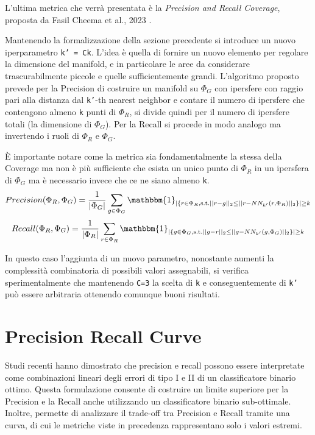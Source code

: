 L'ultima metrica che verrà presentata è la \textit{Precision and Recall Coverage}, proposta da Fasil Cheema et al., 2023 \cite{1PrecisionRecallCover}.

Mantenendo la formalizzazione della sezione precedente si introduce un nuovo iperparametro \texttt{k' = Ck}. L'idea è quella di fornire un nuovo elemento per regolare la dimensione del manifold, e in particolare
le aree da considerare trascurabilmente piccole e quelle sufficientemente grandi. L'algoritmo proposto prevede per la Precision di costruire un manifold su \(\Phi_G\) con ipersfere con raggio pari alla distanza dal \texttt{k'}-th nearest neighbor
e contare il numero di ipersfere che contengono almeno \texttt{k} punti di \(\Phi_R\), si divide quindi per il numero di ipersfere totali (la dimensione di \(\Phi_G\)). 
Per la Recall si procede in modo analogo ma invertendo i ruoli di \(\Phi_R\) e \(\Phi_G\).

È importante notare come la metrica sia fondamentalmente la stessa della Coverage ma non è più sufficiente che esista un unico punto di \(\Phi_R\) in un ipersfera di \(\Phi_G\) ma è necessario invece che ce ne siano almeno \texttt{k}.
\begin{equation}
    Precision(\Phi_R, \Phi_G) = \frac{1}{|\Phi_G|} \sum_{g \in \Phi_G} \mathbbm{1}_{|\{ r \in \Phi_R, \text{s.t.} ||r - g||_2 \leq ||r - NN_{k'}(r, \Phi_R)||_2 \}| \geq k}
\end{equation}
\begin{equation}
    Recall(\Phi_R, \Phi_G) = \frac{1}{|\Phi_R|} \sum_{r \in \Phi_R} \mathbbm{1}_{|\{ g \in \Phi_G, \text{s.t.} ||g - r||_2 \leq ||g - NN_{k'}(g, \Phi_G)||_2 \}| \geq k}
\end{equation}

In questo caso l'aggiunta di un nuovo parametro, nonostante aumenti la complessità combinatoria di possibili valori assegnabili, si verifica sperimentalmente che mantenendo \texttt{C=3} la scelta di \texttt{k} e conseguentemente di \texttt{k'} può essere arbitraria
ottenendo comunque buoni risultati.

\section{Precision Recall Curve}  
\label{sec:precision-recall-curve}

Studi recenti \cite{5RevisitingPrecisionRecall, 6UnifyingPrecisionRecall, 7AssessingWithPrecisionRecall} hanno dimostrato che precision e recall possono essere interpretate come combinazioni lineari degli errori di tipo I e II di un classificatore binario ottimo.
Questa formulazione consente di costruire un limite superiore per la Precision e la Recall anche utilizzando un classificatore binario sub-ottimale. 
Inoltre, permette di analizzare il trade-off tra Precision e Recall tramite una curva, di cui le metriche viste in precedenza rappresentano solo i valori estremi.


